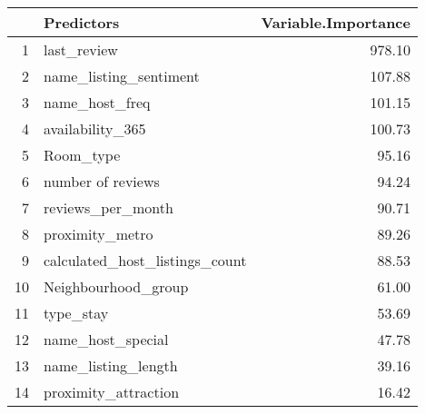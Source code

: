 \begin{table}[ht]
\centering
\begin{tabular}{rlr}
  \hline
 & Predictors & Variable.Importance \\ 
  \hline
1 & last\_review & 978.10 \\ 
  2 & name\_listing\_sentiment & 107.88 \\ 
  3 & name\_host\_freq & 101.15 \\ 
  4 & availability\_365 & 100.73 \\ 
  5 & Room\_type & 95.16 \\ 
  6 & number of reviews & 94.24 \\ 
  7 & reviews\_per\_month & 90.71 \\ 
  8 & proximity\_metro & 89.26 \\ 
  9 & calculated\_host\_listings\_count & 88.53 \\ 
  10 & Neighbourhood\_group & 61.00 \\ 
  11 & type\_stay & 53.69 \\ 
  12 & name\_host\_special & 47.78 \\ 
  13 & name\_listing\_length & 39.16 \\ 
  14 & proximity\_attraction & 16.42 \\ 
   \hline
\end{tabular}
\end{table}
